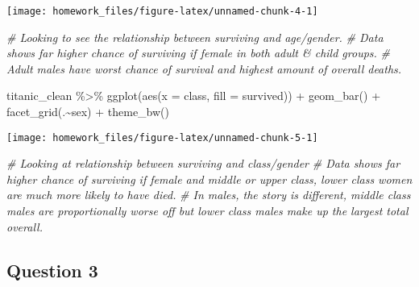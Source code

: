 \documentclass[
]{article}
\newenvironment{Shaded}{\begin{snugshade}}{\end{snugshade}}
\newcommand{\AttributeTok}[1]{\textcolor[rgb]{0.77,0.63,0.00}{#1}}
\newcommand{\CommentTok}[1]{\textcolor[rgb]{0.56,0.35,0.01}{\textit{#1}}}
\newcommand{\FunctionTok}[1]{\textcolor[rgb]{0.00,0.00,0.00}{#1}}
\newcommand{\NormalTok}[1]{#1}
\newcommand{\SpecialCharTok}[1]{\textcolor[rgb]{0.00,0.00,0.00}{#1}}
\begin{document}
\begin{center}\texttt{[image: homework\_files/figure-latex/unnamed-chunk-4-1]} \end{center}

\begin{Shaded}
\begin{Highlighting}[]
\CommentTok{\# Looking to see the relationship between surviving and age/gender.}
\CommentTok{\# Data shows far higher chance of surviving if female in both adult \& child groups.}
\CommentTok{\# Adult males have worst chance of survival and highest amount of overall deaths.}
\end{Highlighting}
\end{Shaded}

\begin{Shaded}
\begin{Highlighting}[]
\NormalTok{titanic\_clean }\SpecialCharTok{\%\textgreater{}\%} 
  \FunctionTok{ggplot}\NormalTok{(}\FunctionTok{aes}\NormalTok{(}\AttributeTok{x =}\NormalTok{ class, }\AttributeTok{fill =}\NormalTok{ survived)) }\SpecialCharTok{+} 
  \FunctionTok{geom\_bar}\NormalTok{() }\SpecialCharTok{+} 
  \FunctionTok{facet\_grid}\NormalTok{(.}\SpecialCharTok{\textasciitilde{}}\NormalTok{sex) }\SpecialCharTok{+} 
  \FunctionTok{theme\_bw}\NormalTok{()}
\end{Highlighting}
\end{Shaded}

\begin{center}\texttt{[image: homework\_files/figure-latex/unnamed-chunk-5-1]} \end{center}

\begin{Shaded}
\begin{Highlighting}[]
\CommentTok{\# Looking at relationship between surviving and class/gender}
\CommentTok{\# Data shows far higher chance of surviving if female and middle or upper class, lower class women are much more likely to have died.}
\CommentTok{\# In males, the story is different, middle class males are proportionally worse off but lower class males make up the largest total overall.}
\end{Highlighting}
\end{Shaded}

\hypertarget{question-3}{%
\subsection{Question 3}\label{question-3}}
\end{document}
